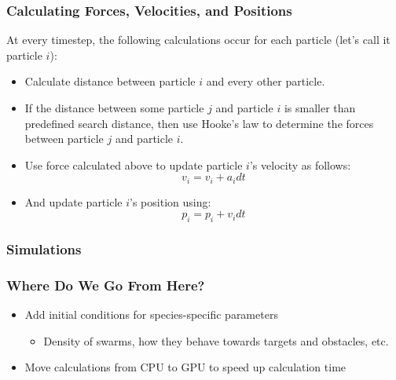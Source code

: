 \documentclass[xcolor=dvipsnames]{beamer}
\begin{document}
\begin{frame}
	\frametitle{Calculating Forces, Velocities, and Positions}
	At every timestep, the following calculations occur for each particle (let's call it particle $i$):
	\pause
	\begin{itemize}
		\item Calculate distance between particle $i$ and every other particle. \pause
		\item If the distance between some particle $j$ and particle $i$ is smaller than predefined search distance, then use Hooke's law to determine the forces between particle $j$ and particle $i$. \pause
		\item Use force calculated above to update particle $i$'s velocity as follows: \pause
			\begin{equation*}
				v_{i} = v_{i} + a_{i}dt
			\end{equation*} \pause
		\item And update particle $i$'s position using: \pause
			\begin{equation*}
				p_{i} = p_{i} + v_{i}dt	
			\end{equation*}

		
	\end{itemize}
\end{frame}

\begin{frame}
	\frametitle{Simulations}
\end{frame}

\begin{frame}
	\frametitle{Where Do We Go From Here?}
	\begin{itemize}
		\item Add initial conditions for species-specific parameters 
			\begin{itemize}
				\item Density of swarms, how they behave towards targets and obstacles, etc.
			\end{itemize}
		\item Move calculations from CPU to GPU to speed up calculation time
	\end{itemize}
\end{frame}
\end{document}
